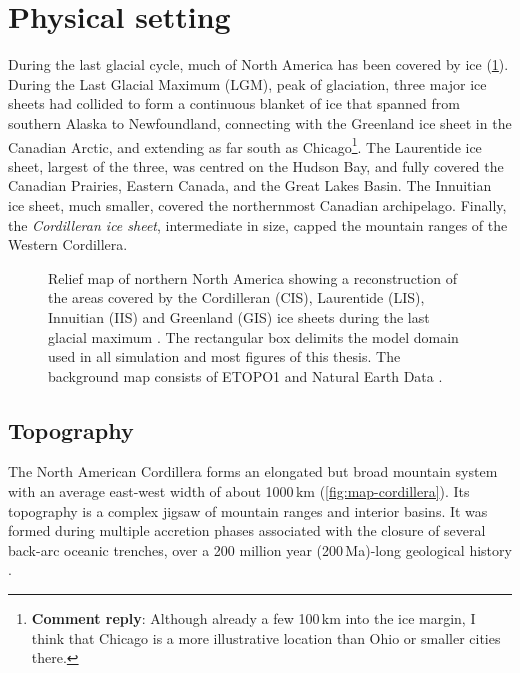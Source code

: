 \documentclass{article}
\newcommand{\renote}[1]{\footnote{\textbf{Comment reply}: #1}}
\newcommand{\chem}[1]{\ensuremath{\mathrm{#1}}}
\begin{document}
\section{Physical setting}

During the last glacial cycle, much of North America has been covered by ice
(\cref{fig:map-northamerica}). During the Last Glacial Maximum (LGM), peak of
glaciation, three major ice sheets had collided to
form a continuous blanket of ice that spanned from southern Alaska to
Newfoundland, connecting with the Greenland ice sheet in the Canadian Arctic,
and extending as far south as Chicago\renote{
    Although already a few 100\,km into the ice margin, I think that Chicago
    is a more illustrative location than Ohio or smaller cities there.}.
The Laurentide ice sheet, largest of the three, was centred on the Hudson Bay,
and fully covered the Canadian Prairies, Eastern Canada, and the Great Lakes
Basin. The Innuitian ice sheet, much smaller, covered the northernmost Canadian
archipelago. Finally, the \emph{Cordilleran ice sheet}, intermediate in size,
capped the mountain
ranges of the Western Cordillera.

\begin{figure}
  \centering
  \caption{Relief map of northern North America showing a reconstruction of the
           areas covered by the Cordilleran (CIS), Laurentide (LIS), Innuitian
           (IIS) and Greenland (GIS) ice sheets during the last glacial maximum
           \citep[21.4 to 16.8\,cal\,\chem{^{14}C}\,kyr\,BP,][]{Dyke.2004}.
           The rectangular box delimits the model domain used in all simulation
           and most figures of this thesis. The background
           map consists of ETOPO1 \citep{Amante.Eakins.2009} and Natural Earth
           Data \citep{Patterson.Kelso.2014}.}
  \label{fig:map-northamerica}
\end{figure}

\subsection{Topography}

The North American Cordillera forms an elongated but broad mountain system with
an average east-west width of about 1000\,km (\cref{fig:map-cordillera}). Its
topography is a complex jigsaw of mountain ranges and interior basins. It was
formed during multiple accretion phases associated with the closure of several
back-arc oceanic trenches, over a 200 million year (200\,Ma)-long geological
history \citep{Sigloch.Mihalynuk.2013}.
\end{document}
